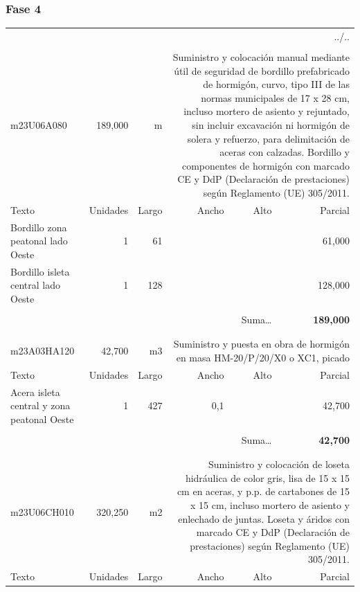 \documentclass{book}%
\begin{document}
\subsubsection{Fase 4}%
\begin{longtable}{lrrrrr}%
\multicolumn{6}{r}{../..}\\%
\endfoot%
\endlastfoot%
&&&&&\\%
m23U06A080&   189,000& m&\multicolumn{3}{p{6cm}}{\scriptsize Suministro y colocación manual mediante útil de seguridad de bordillo prefabricado de hormigón, curvo, tipo III de las normas municipales de 17 x 28 cm, incluso mortero de asiento y rejuntado, sin incluir excavación ni hormigón de solera y refuerzo, para delimitación de aceras con calzadas. Bordillo y componentes de hormigón con marcado CE y DdP (Declaración de prestaciones) según Reglamento (UE) 305/2011.\normalsize}\\%
Texto&Unidades&Largo&Ancho&Alto&Parcial\\%
\hline%
\multicolumn{1}{p{3.5cm}}{Bordillo  zona peatonal lado Oeste}&1&61&&&    61,000\\%
\multicolumn{1}{p{3.5cm}}{Bordillo  isleta central lado Oeste}&1&128&&&   128,000\\%
&&&&&\\%
\multicolumn{5}{r}{Suma\ldots}&\textbf{   189,000}\\%
\hline%
&&&&&\\%
&&&&&\\%
m23A03HA120&    42,700& m3&\multicolumn{3}{p{6cm}}{\scriptsize Suministro y puesta en obra de hormigón en masa HM-20/P/20/X0 o XC1, picado\normalsize}\\%
Texto&Unidades&Largo&Ancho&Alto&Parcial\\%
\hline%
\multicolumn{1}{p{3.5cm}}{Acera isleta central y zona peatonal Oeste}&1&427&0,1&&    42,700\\%
&&&&&\\%
\multicolumn{5}{r}{Suma\ldots}&\textbf{    42,700}\\%
\hline%
&&&&&\\%
&&&&&\\%
m23U06CH010&   320,250& m2&\multicolumn{3}{p{6cm}}{\scriptsize Suministro y colocación de loseta hidráulica de color gris, lisa de 15 x 15 cm en aceras, y p.p. de cartabones de 15 x 15 cm, incluso mortero de asiento y enlechado de juntas. Loseta y áridos con marcado CE y DdP (Declaración de prestaciones) según Reglamento (UE) 305/2011.\normalsize}\\%
Texto&Unidades&Largo&Ancho&Alto&Parcial\\%

\end{longtable}
\end{document}
